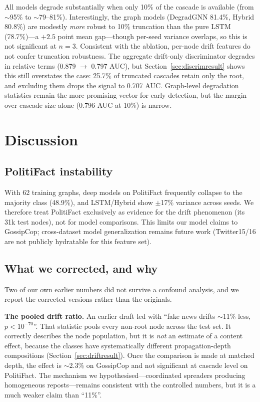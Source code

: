 \documentclass[10pt,twocolumn]{article}
\begin{document}
All models degrade substantially when only 10\% of the cascade is available
(from $\sim$95\% to $\sim$79--81\%). Interestingly, the graph models (DegradGNN
81.4\%, Hybrid 80.8\%) are modestly \emph{more} robust to 10\% truncation than
the pure LSTM (78.7\%)---a $+2.5$ point mean gap---though per-seed variance
overlaps, so this is not significant at $n=3$. Consistent with the ablation,
per-node drift features do not confer truncation robustness. The aggregate
drift-only discriminator degrades in relative terms (0.879 $\rightarrow$ 0.797
AUC), but Section~\ref{sec:discrimresult} shows this still overstates the
case: 25.7\% of truncated cascades retain only the root, and excluding them
drops the signal to 0.707 AUC. Graph-level degradation statistics remain the
more promising vector for early detection, but the margin over cascade size
alone (0.796 AUC at 10\%) is narrow.

\section{Discussion}
\label{sec:discussion}

\subsection{PolitiFact instability}
\label{sec:politifact}
With 62 training graphs, deep models on PolitiFact frequently collapse to the
majority class (48.9\%), and LSTM/Hybrid show $\pm$17\% variance across seeds.
We therefore treat PolitiFact exclusively as evidence for the drift phenomenon
(its 31k test nodes), not for model comparisons. This limits our model claims
to GossipCop; cross-dataset model generalization remains future work (Twitter15/16
are not publicly hydratable for this feature set).

\subsection{What we corrected, and why}
\label{sec:corrections}
Two of our own earlier numbers did not survive a confound analysis, and we report
the corrected versions rather than the originals.

\textbf{The pooled drift ratio.} An earlier draft led with ``fake news drifts
$\sim$11\% less, $p<10^{-70}$''. That statistic pools every non-root node
across the test set. It correctly describes the node population, but it is
\emph{not} an estimate of a content effect, because the classes have
systematically different propagation-depth compositions
(Section~\ref{sec:driftresult}). Once the comparison is made at matched depth,
the effect is $\sim$2.3\% on GossipCop and not significant at cascade level on
PolitiFact. The mechanism we hypothesised---coordinated spreaders producing
homogeneous reposts---remains consistent with the controlled numbers, but it is
a much weaker claim than ``11\%''.
\end{document}
